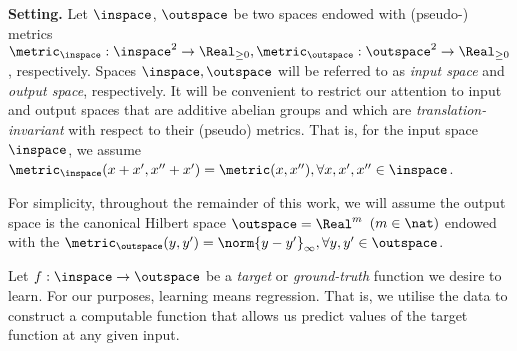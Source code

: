 %
%
%
%
%
%
%

%
\textbf{Setting.}  Let $\inspace$, $\outspace$ be two spaces endowed with (pseudo-) metrics $\metric_{\inspace}: \inspace^2 \to \Real_{\geq 0}, \metric_\outspace:\outspace^2 \to \Real_{\geq 0}$, respectively. Spaces $\inspace, \outspace$ will be referred to as \textit{input space} and \textit{output space}, respectively. 
It will be convenient to restrict our attention to input and output spaces that are additive abelian groups and which are \emph{translation-invariant} with respect to their (pseudo) metrics. That is, for the input space $\inspace$, we assume $ \metric_\inspace(x+x',x''+x') = \metric(x,x''),\forall x,x',x'' \in \inspace$. 

For simplicity, throughout the remainder of this work, we will assume the output space is the canonical Hilbert space $\outspace = \Real^m$ $(m \in \nat)$ endowed with the $\metric_{\outspace}(y,y') = \norm{y-y'}_\infty, \forall y,y' \in \outspace$. 

Let $f: \inspace \to \outspace$ be a \emph{target} or \emph{ground-truth} function we desire to learn. For our purposes, learning means regression. That is, we utilise the data to construct a computable function that allows us predict values of the target function at any given input.






